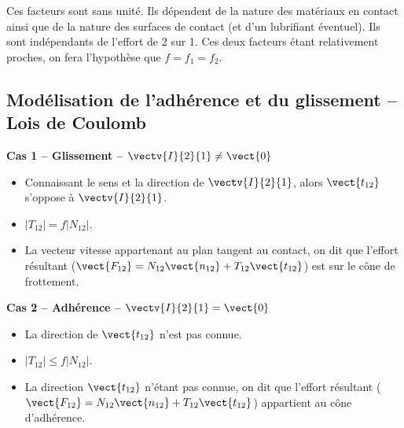 \documentclass[10pt,fleqn]{article} %
\begin{document}
Ces facteurs sont sans unité. Ils dépendent de la nature des matériaux en contact ainsi que de la nature des surfaces de contact (et d'un lubrifiant éventuel). Ils sont indépendants de l'effort de 2 sur 1. Ces deux facteurs étant relativement proches, on fera l'hypothèse que $f=f_1=f_2$. 

\subsection{Modélisation de l'adhérence et du glissement -- Lois de Coulomb}

\noindent\begin{minipage}[t]{.35\linewidth}
\begin{center}
\textbf{Cas 1 -- Glissement -- $\vectv{I}{2}{1}\neq \vect{0}$}
\end{center}

\begin{itemize}
\item Connaissant le sens et la direction de $\vectv{I}{2}{1}$, alors $\vect{t_{12}}$ s'oppose à $\vectv{I}{2}{1}$.
\item $|T_{12}| = f |N_{12}|$.
\item La vecteur vitesse appartenant au plan tangent au contact, on dit que l'effort résultant ($\vect{F_{12}}=N_{12} \vect{n_{12}}+T_{12} \vect{t_{12}}$) est sur le cône de frottement. 
\end{itemize}
\end{minipage}\hfill
\begin{minipage}[t]{.35\linewidth}
\begin{center}
\textbf{Cas 2 -- Adhérence -- $\vectv{I}{2}{1} = \vect{0}$}
\end{center}

\begin{itemize}
\item La direction de $\vect{t_{12}}$ n'est pas connue. 
\item $|T_{12}| \leq f |N_{12}|$.
\item La direction $\vect{t_{12}}$ n'étant pas connue, on dit que l'effort résultant ($\vect{F_{12}}=N_{12} \vect{n_{12}}+T_{12} \vect{t_{12}}$) appartient au cône d'adhérence. 
\end{itemize}
\end{minipage}\hfill
\end{document}
